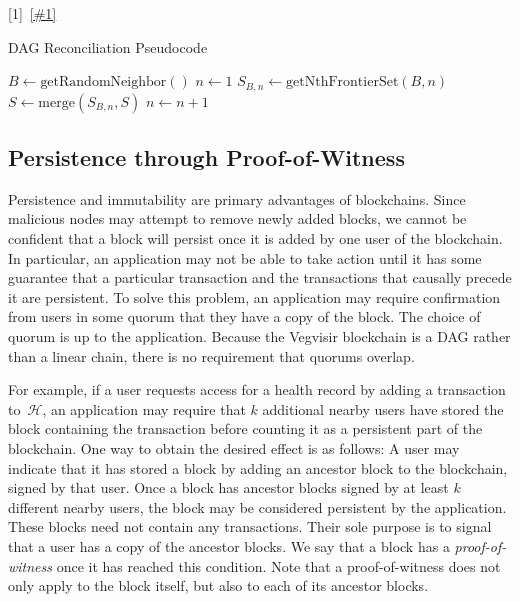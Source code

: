 \documentclass[conference, letterpaper]{IEEEtran}
\begin{document}
%
\algnewcommand{\Goto}[1]{\algorithmicgoto~\ref{#1}}%
\begin{algorithm}
\caption{DAG Reconciliation Pseudocode}
\begin{algorithmic}[1]
\State $B \gets \mbox{getRandomNeighbor}()$
\State $n \gets 1$
\State $S_{B,n} \gets \mbox{getNthFrontierSet}(B, n)$ \label{alg:line}
\State $S \gets \mbox{merge}(S_{B,n}, S)$
\Else
\State $n \gets n + 1$
\State {}
\EndIf
\EndIf

\EndProcedure \label{alg:end}
\end{algorithmic}
\end{algorithm}

\subsection{Persistence through Proof-of-Witness}

Persistence and immutability are primary advantages of blockchains. Since malicious nodes may attempt to remove newly added blocks, we cannot be confident that a block will persist once it is added by one user of the blockchain.  In particular, an application may not be able to take action until it has some guarantee that a particular transaction and the transactions that causally precede it are persistent.
To solve this problem, an application may require confirmation from users in some quorum that they have a copy of the block.  The choice of quorum is up to the application. Because the Vegvisir blockchain is a DAG rather than a linear chain, there is no requirement that quorums overlap.

For example, if a user requests access for a health record by adding a transaction to~$\mathcal{H}$, an application may require that $k$ additional nearby users have stored the block containing the transaction before counting it as a persistent part of the blockchain.  One way to obtain the desired effect is as follows: A user may indicate that it has stored a block by adding an ancestor block to the blockchain, signed by that user.  Once a block has ancestor blocks signed by at least $k$ different nearby users, the block may be considered persistent by the application.  These blocks need not contain any transactions. Their sole purpose is to signal that a user has a copy of the ancestor blocks. We say that a block has a \emph{proof-of-witness} once it has reached this condition.  Note that a proof-of-witness does not only apply to the block itself, but also to each of its ancestor blocks.
\end{document}
